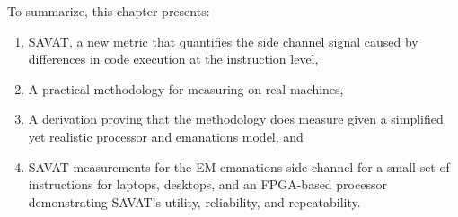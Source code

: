 To summarize, this chapter presents: 
\begin{enumerate}
\item SAVAT, a new metric that quantifies the side channel signal caused by differences in code execution at the instruction level, 
\item A practical methodology for measuring \SAVAT on real machines, 
\item A derivation proving that the methodology does measure \SAVAT given a simplified yet realistic processor and emanations model, and
\item SAVAT measurements for the EM emanations side channel for a small set of instructions for laptops, desktops, and an FPGA-based processor demonstrating SAVAT's utility, reliability, and repeatability.
\end{enumerate}
